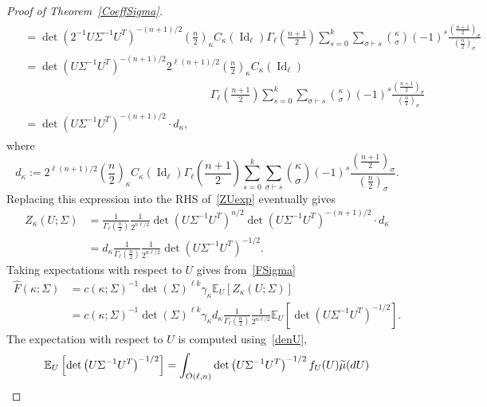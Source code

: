 \documentclass[10pt]{amsart}
\theoremstyle{definition}\newtheorem{defi}[theo]{Definition}\newtheorem{rema}[theo]{Remark}\newtheorem{exam}[theo]{Example}\newtheorem{exem}[theo]{Example}\newtheorem{nota}[theo]{Notation}
\DeclareMathOperator{\Id}{Id}
\newcommand{\EX}[2]{\mathbb{E}_{#1}\left[#2\right]}
\let\oldtilde\tilde
\renewcommand*{\tilde}[1]{\mathchoice{\widetilde{#1}}{\widetilde{#1}}{\oldtilde{#1}}{\oldtilde{#1}}}
\begin{document}
\begin{proof}[Proof of Theorem~\ref{CoeffSigma}]
\begin{multline*}
\begin{aligned}
&= \det\left(2^{-1}U\Sigma^{-1}U^T\right)^{-(n+1)/2}
\left(\frac{n}{2}\right)_{\kappa} C_{\kappa}(\Id_{\ell})
\Gamma_{\ell}\left(\frac{n+1}{2}\right)
\sum_{s=0}^{k} \sum_{\sigma \vdash s} \binom{\kappa}{\sigma} (-1)^s\frac{\left(\frac{n+1}{2}\right)_{\sigma}}{\left(\frac{n}{2}\right)_{\sigma}} \\
&=\det\left(U\Sigma^{-1}U^T\right)^{-(n+1)/2} 2^{\ell(n+1)/2}\left(\frac{n}{2}\right)_{\kappa} C_{\kappa}\left(\Id_{\ell}\right)\\
&\hspace{7cm}\Gamma_{\ell}\left(\frac{n+1}{2}\right)
\sum_{s=0}^{k} \sum_{\sigma \vdash s} \binom{\kappa}{\sigma} (-1)^s\frac{\left(\frac{n+1}{2}\right)_{\sigma}}{\left(\frac{n}{2}\right)_{\sigma}} \\
&= \det\left(U\Sigma^{-1}U^T\right)^{-(n+1)/2} \cdot d_{\kappa},
\end{aligned}
\end{multline*}
where
\begin{equation}\label{dk}
d_{\kappa}:= 2^{\ell(n+1)/2}\left(\frac{n}{2}\right)_{\kappa} C_{\kappa}(\Id_{\ell})
\Gamma_{\ell}\left(\frac{n+1}{2}\right)
\sum_{s=0}^{k} \sum_{\sigma \vdash s} \binom{\kappa}{\sigma} (-1)^s\frac{\left(\frac{n+1}{2}\right)_{\sigma}}{\left(\frac{n}{2}\right)_{\sigma}}.
\end{equation}
Replacing this expression into the RHS of~\eqref{ZUexp} eventually gives
\begin{align*}
Z_{\kappa}(U;\Sigma) &=\frac{1}{\Gamma_{\ell}\left(\frac{n}{2}\right)}
\frac{1}{2^{n\ell/2}} \det\left(U\Sigma^{-1}U^T\right)^{ n/2} \det\left(U\Sigma^{-1}U^T\right)^{-(n+1)/2} \cdot d_{\kappa} \\
&=d_{\kappa} \frac{1}{\Gamma_{\ell}\left(\frac{n}{2}\right)}
\frac{1}{2^{n\ell/2}} \det\left(U\Sigma^{-1}U^T\right)^{-1/2}.
\end{align*}
Taking expectations with respect to $U$ gives from~\eqref{FSigma}
\begin{align*}
\widehat{F}(\kappa;\Sigma) &= c(\kappa;\Sigma)^{-1} \det(\Sigma)^{\ell k} \gamma_{\kappa}
\EX{U}{Z_{\kappa}(U;\Sigma)} \\
&= c(\kappa;\Sigma)^{-1}
\det(\Sigma)^{\ell k} \gamma_{\kappa} d_{\kappa} \frac{1}{\Gamma_{\ell}\left(\frac{n}{2}\right)}
\frac{1}{2^{n\ell/2}} \EX{U}{\det\left(U\Sigma^{-1}U^T\right)^{-1/2}}.
\end{align*}
The expectation with respect to $U$ is computed using~\eqref{denU},
\begin{align*}
\EX{U}{\det\left(U\Sigma^{-1}U^T\right)^{-1/2}} &= \int_{O(\ell,n)} \det\left(U\Sigma^{-1}U^T\right)^{-1/2} f_U(U) \tilde{\mu}(dU) \\

\end{align*}
\end{proof}
\end{document}
